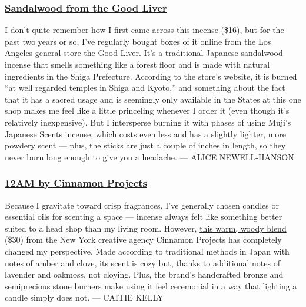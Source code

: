\hypertarget{sandalwood-from-the-good-liver}{%
\subsubsection{\texorpdfstring{\textbf{\href{https://good-liver.com/products/incense-sandalwood}{Sandalwood
from the Good
Liver}}}{Sandalwood from the Good Liver}}\label{sandalwood-from-the-good-liver}}

I don't quite remember how I first came across
\href{https://good-liver.com/products/incense-sandalwood}{this incense}
(\$16), but for the past two years or so, I've regularly bought boxes of
it online from the Los Angeles general store the Good Liver. It's a
traditional Japanese sandalwood incense that smells something like a
forest floor and is made with natural ingredients in the Shiga
Prefecture. According to the store's website, it is burned ``at well
regarded temples in Shiga and Kyoto,'' and something about the fact that
it has a sacred usage and is seemingly only available in the States at
this one shop makes me feel like a little princeling whenever I order it
(even though it's relatively inexpensive). But I intersperse burning it
with phases of using Muji's Japanese Scents incense, which costs even
less and has a slightly lighter, more powdery scent --- plus, the sticks
are just a couple of inches in length, so they never burn long enough to
give you a headache. --- ALICE NEWELL-HANSON

\hypertarget{12am-by-cinnamon-projects}{%
\subsubsection{\texorpdfstring{\textbf{\href{https://www.cinnamonprojects.com/product/incense-solo-12am/}{12AM
by Cinnamon
Projects}}}{12AM by Cinnamon Projects}}\label{12am-by-cinnamon-projects}}

Because I gravitate toward crisp fragrances, I've generally chosen
candles or essential oils for scenting a space --- incense always felt
like something better suited to a head shop than my living room.
However,
\href{https://www.cinnamonprojects.com/product/incense-solo-12am/}{this
warm, woody blend} (\$30) from the New York creative agency Cinnamon
Projects has completely changed my perspective. Made according to
traditional methods in Japan with notes of amber and clove, its scent is
cozy but, thanks to additional notes of lavender and oakmoss, not
cloying. Plus, the brand's handcrafted bronze and semiprecious stone
burners make using it feel ceremonial in a way that lighting a candle
simply does not. --- CAITIE KELLY


